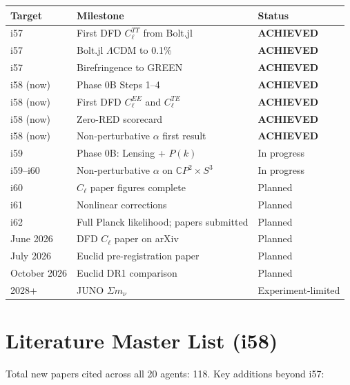 \documentclass[11pt,a4paper]{article}
\newcommand{\CP}{\mathbb{C}P}
\begin{document}
\begin{center}
\begin{longtable}{lll}
\toprule
\textbf{Target} & \textbf{Milestone} & \textbf{Status} \\
\midrule
i57 & First DFD $C_\ell^{TT}$ from Bolt.jl & \textbf{ACHIEVED} \\
i57 & Bolt.jl $\Lambda$CDM to 0.1\% & \textbf{ACHIEVED} \\
i57 & Birefringence to GREEN & \textbf{ACHIEVED} \\
i58 (now) & Phase 0B Steps 1--4 & \textbf{ACHIEVED} \\
i58 (now) & First DFD $C_\ell^{EE}$ and $C_\ell^{TE}$ & \textbf{ACHIEVED} \\
i58 (now) & Zero-RED scorecard & \textbf{ACHIEVED} \\
i58 (now) & Non-perturbative $\alpha$ first result & \textbf{ACHIEVED} \\
i59 & Phase 0B: Lensing + $P(k)$ & In progress \\
i59--i60 & Non-perturbative $\alpha$ on $\CP^2 \times S^3$ & In progress \\
i60 & $C_\ell$ paper figures complete & Planned \\
i61 & Nonlinear corrections & Planned \\
i62 & Full Planck likelihood; papers submitted & Planned \\
June 2026 & DFD $C_\ell$ paper on arXiv & Planned \\
July 2026 & Euclid pre-registration paper & Planned \\
October 2026 & Euclid DR1 comparison & Planned \\
2028+ & JUNO $\Sigma m_\nu$ & Experiment-limited \\
\bottomrule
\end{longtable}
\end{center}


\section{Literature Master List (i58)}
\label{sec:literature}

Total new papers cited across all 20 agents: 118. Key additions beyond i57:
\end{document}
